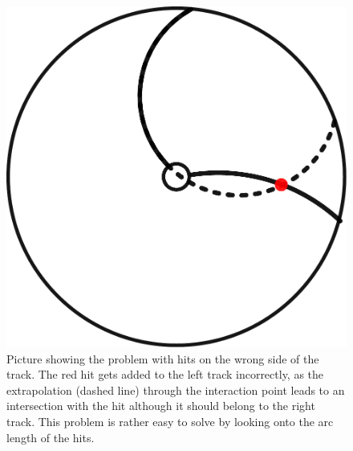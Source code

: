 \begin{figure}
  \centering
  \includegraphics[width=0.4\linewidth]{figures/workflow/B2B.pdf}
  \caption{Picture showing the problem with hits on the wrong side of the track. The red hit gets added to the left track incorrectly, as the extrapolation (dashed line) through the interaction point leads to an intersection with the hit although it should belong to the right track. This problem is rather easy to solve by looking onto the arc length of the hits.}
  \label{fig-b2btrack}
\end{figure}

